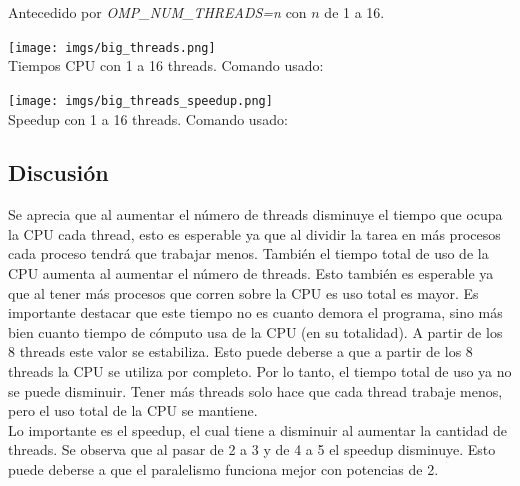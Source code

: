 \documentclass[10pt]{extarticle}
\begin{document}
Antecedido por \textit{OMP\_NUM\_THREADS=n} con $n$ de 1 a 16.\\

\begin{center}
 \texttt{[image: imgs/big\_threads.png]}\\
 \footnotesize{Tiempos CPU con 1 a 16 threads. Comando usado:}\\
\end{center}


\begin{center}
 \texttt{[image: imgs/big\_threads\_speedup.png]}\\
 \footnotesize{Speedup con 1 a 16 threads. Comando usado:}\\
\end{center}

\subsection*{Discusión}
Se aprecia que al aumentar el número de threads disminuye el tiempo que ocupa la CPU cada thread, esto es esperable ya que al dividir la tarea en más procesos cada proceso tendrá que trabajar menos. También el tiempo total de uso de la CPU aumenta al aumentar el número de threads. Esto también es esperable ya que al tener más procesos que corren sobre la CPU es uso total es mayor. Es importante destacar que este tiempo no es cuanto demora el programa, sino más bien cuanto tiempo de cómputo usa de la CPU (en su totalidad). A partir de los 8 threads este valor se estabiliza. Esto puede deberse a que a partir de los 8 threads la CPU se utiliza por completo. Por lo tanto, el tiempo total de uso ya no se puede disminuir. Tener más threads solo hace que cada thread trabaje menos, pero el uso total de la CPU se mantiene.\\

Lo importante es el speedup, el cual tiene a disminuir al aumentar la cantidad de threads. Se observa que al pasar de 2 a 3 y de 4 a 5 el speedup disminuye. Esto puede deberse a que el paralelismo funciona mejor con potencias de 2.\\
\end{document}
